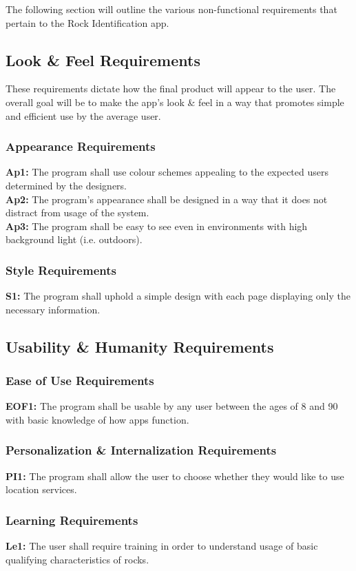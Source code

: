 \documentclass[titlepage]{article}
\begin{document}
The following section will outline the various non-functional requirements that pertain to the Rock Identification app.

\subsection{Look \& Feel Requirements}
These requirements dictate how the final product will appear to the user. The overall goal will be to make the app's look \& feel in a way that promotes simple and efficient use by the average user.
\subsubsection{Appearance Requirements}
\textbf{Ap1:} The program shall use colour schemes appealing to the expected users determined by the designers.\\

\noindent\textbf{Ap2:} The program's appearance shall be designed in a way that it does not distract from usage of the system.\\

\noindent\textbf{Ap3:} The program shall be easy to see even in environments with high background light (i.e. outdoors).

\subsubsection{Style Requirements}
\textbf{S1:} The program shall uphold a simple design with each page displaying only the necessary information.

\subsection{Usability \& Humanity Requirements}
\subsubsection{Ease of Use Requirements}
\textbf{EOF1:} The program shall be usable by any user between the ages of 8 and 90 with basic knowledge of how apps function.
\subsubsection{Personalization \& Internalization Requirements}
\textbf{PI1:} The program shall allow the user to choose whether they would like to use location services.
\subsubsection{Learning Requirements}
\textbf{Le1:} The user shall require training in order to understand usage of basic qualifying characteristics of rocks.
\end{document}
